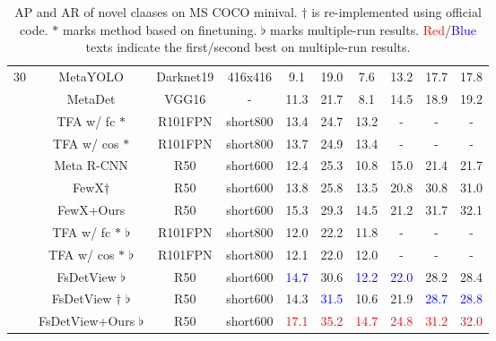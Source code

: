 \documentclass[10pt,twocolumn,letterpaper]{article}
\begin{document}
\begin{table*}
\begin{center}
\begin{tabular}{|c|c|c|c|c|c|c|c|c|c|}
\multirow{11}{*}{30} &  MetaYOLO \cite{kang2019few}   & Darknet19 & 416x416 & 9.1 & 19.0 & 7.6 & 13.2 & 17.7 & 17.8 \\
& MetaDet \cite{wang2019meta}  & VGG16 & - & 11.3 & 21.7 & 8.1 & 14.5 & 18.9 & 19.2 \\
&  TFA w/ fc $\ast$ \cite{wang2020frustratingly} & R101FPN & short800 & 13.4 & 24.7 & 13.2 & - & - & - \\
&  TFA w/ cos $\ast$ \cite{wang2020frustratingly} & R101FPN & short800 & 13.7 & 24.9 & 13.4 & - & - & - \\
& Meta R-CNN \cite{yan2019meta} & R50  & short600 & 12.4 & 25.3 & 10.8 & 15.0 & 21.4 & 21.7 \\
&  FewX$\dagger$ \cite{fan2020fsod}   & R50 & short600 & 13.8 & 25.8 & 13.5 & 20.8 & 30.8 & 31.0 \\
\rowcolor{Gray}
\cellcolor{white} & FewX+Ours & R50 & short600 & 15.3 & 29.3 & 14.5 & 21.2 & 31.7 & 32.1 \\ \cline{2-10}
&  TFA w/ fc $\ast$ $\flat$ \cite{wang2020frustratingly} & R101FPN & short800 & 12.0 & 22.2 & 11.8 & - & - & - \\
&  TFA w/ cos $\ast$ $\flat$ \cite{wang2020frustratingly} & R101FPN & short800 & 12.1 & 22.0 & 12.0 & - & - & - \\
&  FsDetView $\flat$ \cite{xiao2020few}    & R50 & short600 & \textcolor{blue}{14.7}  & 30.6  & \textcolor{blue}{12.2} & \textcolor{blue}{22.0} & 28.2 & 28.4 \\
& FsDetView $\dagger$ $\flat$   & R50 & short600 & 14.3  & \textcolor{blue}{31.5}  & 10.6 & 21.9 & \textcolor{blue}{28.7} & \textcolor{blue}{28.8} \\
\rowcolor{Gray}
\cellcolor{white} &  FsDetView+Ours $\flat$   & R50 & short600 &  \textcolor{red}{17.1} & \textcolor{red}{35.2} & \textcolor{red}{14.7}  & \textcolor{red}{24.8}& \textcolor{red}{31.2} & \textcolor{red}{32.0} \\ 

   
\hline
\end{tabular}
\end{center} 
\vspace{-0.10cm}
\caption{AP and AR of novel claases on MS COCO minival. $\dagger$ is re-implemented using official code. $\ast$ marks method based on finetuning. $\flat$ marks multiple-run results. \textcolor{red}{Red}/\textcolor{blue}{Blue} texts indicate the first/second best on multiple-run results.}
\label{table:coco_novel}
\end{table*}
\end{document}
